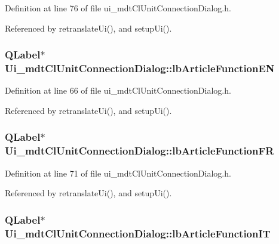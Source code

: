 Definition at line 76 of file ui\-\_\-mdt\-Cl\-Unit\-Connection\-Dialog.\-h.



Referenced by retranslate\-Ui(), and setup\-Ui().

\hypertarget{class_ui__mdt_cl_unit_connection_dialog_a7879ed1699720b1d4b80a42e8347cb83}{
\subsubsection[{lb\-Article\-Function\-E\-N}]{\setlength{\rightskip}{0pt plus 5cm}Q\-Label$\ast$ Ui\-\_\-mdt\-Cl\-Unit\-Connection\-Dialog\-::lb\-Article\-Function\-E\-N}}\label{class_ui__mdt_cl_unit_connection_dialog_a7879ed1699720b1d4b80a42e8347cb83}


Definition at line 66 of file ui\-\_\-mdt\-Cl\-Unit\-Connection\-Dialog.\-h.



Referenced by retranslate\-Ui(), and setup\-Ui().

\hypertarget{class_ui__mdt_cl_unit_connection_dialog_ab92c40913c2ae390f101a91fcf301381}{
\subsubsection[{lb\-Article\-Function\-F\-R}]{\setlength{\rightskip}{0pt plus 5cm}Q\-Label$\ast$ Ui\-\_\-mdt\-Cl\-Unit\-Connection\-Dialog\-::lb\-Article\-Function\-F\-R}}\label{class_ui__mdt_cl_unit_connection_dialog_ab92c40913c2ae390f101a91fcf301381}


Definition at line 71 of file ui\-\_\-mdt\-Cl\-Unit\-Connection\-Dialog.\-h.



Referenced by retranslate\-Ui(), and setup\-Ui().

\hypertarget{class_ui__mdt_cl_unit_connection_dialog_a7cb9be6da084f70be9ac5739bd8be3ca}{
\subsubsection[{lb\-Article\-Function\-I\-T}]{\setlength{\rightskip}{0pt plus 5cm}Q\-Label$\ast$ Ui\-\_\-mdt\-Cl\-Unit\-Connection\-Dialog\-::lb\-Article\-Function\-I\-T}}\label{class_ui__mdt_cl_unit_connection_dialog_a7cb9be6da084f70be9ac5739bd8be3ca}


